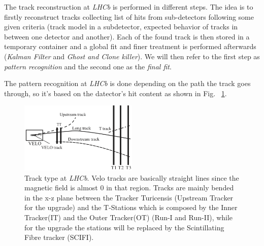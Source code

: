 \documentclass[paper=a4, fontsize=10pt]{scrartcl}
\numberwithin{equation}{section}		%
\numberwithin{figure}{section}			%
\numberwithin{table}{section}				%
\begin{document}

The track reconstruction at \textit{LHCb} is performed in different steps. The idea is to firstly reconstruct tracks collecting list of hits from sub-detectors following some given criteria (track model in a subdetector, expected behavior of tracks in between one detector and another). Each of the found track is then stored in a temporary container and a global fit and finer treatment is performed afterwards (\textit{Kalman Filter} and \textit{Ghost and Clone killer}). We will then refer to the first step as \textit{pattern recognition} and the second one as the \textit{final fit}. 

The pattern recognition at \textit{LHCb} is done depending on the path the track goes through, so it's based on the datector's hit content as shown in Fig. ~\ref{figure:Tracks}.
\begin{figure}[h]
  \begin{center}
    \includegraphics[width=0.5\textwidth]{Images/tracktype.png} 
  \caption[Caption for track type]{Track type at \textit{LHCb}. Velo tracks are basically straight lines since the magnetic field is almost 0 in that region. Tracks are mainly bended in the x-z \footnotemark plane between the Tracker Turicensis (Upstream Tracker for the upgrade) and the T-Stations which is composed by the Inner Tracker(IT) and the Outer Tracker(OT) (Run-I and Run-II), while for the upgrade the stations will be replaced by the Scintillating Fibre tracker (SCIFI).}
  \label{figure:Tracks}
  \end{center}
\end{figure}
\end{document}
